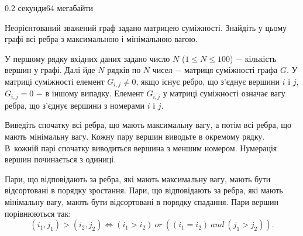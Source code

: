 \begin{problem}{}{}{}{0.2 секунди}{64 мегабайти}

Неорієнтований зважений граф задано матрицею суміжності. Знайдіть у цьому графі всі ребра з максимальною і мінімальною вагою.

\InputFile
У першому рядку вхідних даних задано число $N$ ($1 \le N \le 100$) $-$ кількість вершин у графі.
Далі йде $N$ рядків по $N$ чисел $-$ матриця суміжності графа $G$.
У матриці суміжності елемент $G_{i,j} \ne 0$, якщо існує ребро, що з'єднує вершини $i$ і $j$, $G_{i,j}=0$ $-$ в іншому випадку.
Елемент $G_{i,j}$ у матриці суміжності означає вагу ребра, що з'єднує вершини з номерами $i$ і $j$.

\OutputFile
Виведіть спочатку всі ребра, що мають максимальну вагу, а потім всі ребра, що мають мінімальну вагу.
Кожну пару вершин виводьте в окремому рядку. В~кожній парі спочатку виводиться вершина з меншим номером.
Нумерація вершин починається з одиниці.

Пари, що відповідають за ребра, які мають максимальну вагу, мають бути відсортовані в порядку зростання.
Пари, що відповідають за ребра, які мають мінімальну вагу, мають бути відсортовані в порядку спадання.
Пари вершин порівнюються так: 
$$ (i_1, j_1) > (i_2, j_2) \Leftrightarrow (i_1 > i_2) \ or \ ((i_1=i_2) \ and \ (j_1>j_2)).$$

\Example

\begin{example}
%
\end{example}

\end{problem}
